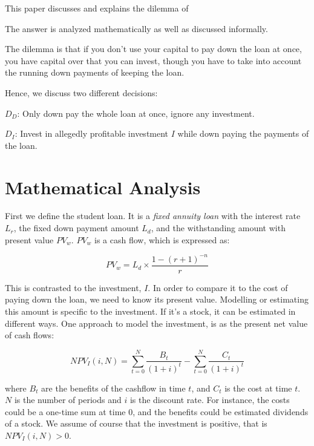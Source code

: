 \documentclass[a4paper]{article}
\title{\documenttitle}
\date{\today}
\author{Frans Englich \\
\href{mailto:fenglich@fastmail.fm}{fenglich@fastmail.fm}}
\begin{document}
\maketitle

This paper discusses and explains the dilemma of 

The answer is analyzed mathematically as well as discussed
informally.

The dilemma is that if you don't use your capital to pay down the loan at once,
you have capital over that you can invest, though you have to take into account
the running down payments of keeping the loan.

Hence, we discuss two different decisions:

$D_D$: Only down pay the whole loan at once, ignore any investment.

$D_I$: Invest in allegedly profitable investment $I$ while down paying the
payments of the loan.

\section{Mathematical Analysis}

First we define the student loan. It is a \emph{fixed annuity loan} with the
interest rate $L_r$, the fixed down payment amount $L_d$, and the withstanding
amount with present value $PV_w$. $PV_w$ is a cash flow, which is expressed as:

\def\PV_w{L_d \times \frac{1 - (r + 1)^{-n}}{r}}
\begin{equation}
PV_w=\PV_w
\end{equation}

This is contrasted to the investment, $I$. In order to compare it to the cost of
paying down the loan, we need to know its present value. Modelling or estimating
this amount is specific to the investment. If it's a stock, it can be estimated
in different ways. One approach to model the investment, is as the present net
value of cash flows:

\def\NPV_I{\sum_{t=0}^{N} \frac{B_t}{(1 + i)^t} - \sum_{t=0}^{N} \frac{C_t}{(1 + i)^t}}
\begin{equation}
NPV_I(i, N)= \NPV_I
\end{equation}

where $B_t$ are the benefits of the cashflow in time $t$, and $C_t$ is the cost
at time $t$. $N$ is the number of periods and $i$ is the discount rate. For
instance, the costs could be a one-time sum at time $0$, and the benefits could
be estimated dividends of a stock. We assume of course that the investment is
positive, that is $NPV_I(i, N) > 0$.
\end{document}
